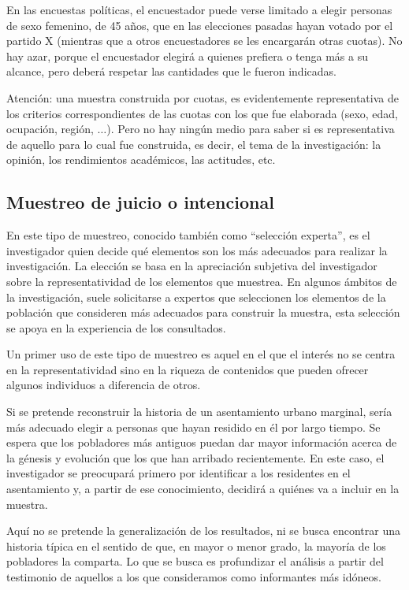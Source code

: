 \documentclass[]{book}
\begin{document}
En las encuestas políticas, el encuestador puede verse limitado a elegir
personas de sexo femenino, de 45 años, que en las elecciones pasadas
hayan votado por el partido X (mientras que a otros encuestadores se les
encargarán otras cuotas). No hay azar, porque el encuestador elegirá a
quienes prefiera o tenga más a su alcance, pero deberá respetar las
cantidades que le fueron indicadas.

Atención: una muestra construida por cuotas, es evidentemente
representativa de los criterios correspondientes de las cuotas con los
que fue elaborada (sexo, edad, ocupación, región, \(\ldots\)). Pero no hay ningún
medio para saber si es representativa de aquello para lo cual fue
construida, es decir, el tema de la investigación: la opinión, los
rendimientos académicos, las actitudes, etc.

\hypertarget{muestreo-de-juicio-o-intencional}{%
\subsection{Muestreo de juicio o intencional}\label{muestreo-de-juicio-o-intencional}}

En este tipo de muestreo, conocido también como ``selección experta'', es
el investigador quien decide qué elementos son los más adecuados para
realizar la investigación. La elección se basa en la apreciación
subjetiva del investigador sobre la representatividad de los elementos
que muestrea. En algunos ámbitos de la investigación, suele solicitarse
a expertos que seleccionen los elementos de la población que consideren
más adecuados para construir la muestra, esta selección se apoya en la
experiencia de los consultados.

Un primer uso de este tipo de muestreo es aquel en el que el interés no
se centra en la representatividad sino en la riqueza de contenidos que
pueden ofrecer algunos individuos a diferencia de otros.

Si se pretende reconstruir la historia de un asentamiento urbano
marginal, sería más adecuado elegir a personas que hayan residido en él
por largo tiempo. Se espera que los pobladores más antiguos puedan dar
mayor información acerca de la génesis y evolución que los que han
arribado recientemente. En este caso, el investigador se preocupará
primero por identificar a los residentes en el asentamiento y, a partir
de ese conocimiento, decidirá a quiénes va a incluir en la muestra.

Aquí no se pretende la generalización de los resultados, ni se busca
encontrar una historia típica en el sentido de que, en mayor o menor
grado, la mayoría de los pobladores la comparta. Lo que se busca es
profundizar el análisis a partir del testimonio de aquellos a los que
consideramos como informantes más idóneos.
\end{document}
